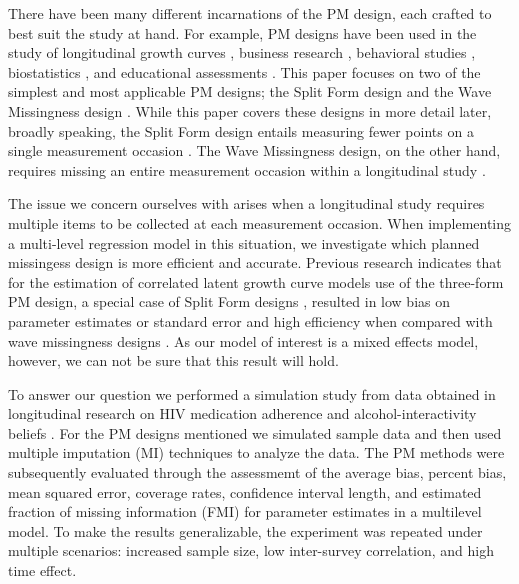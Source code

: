 \documentclass{svjour3}\usepackage[]{graphicx}\usepackage[]{color}
\begin{document}
There have been many different incarnations of the PM design, each crafted to best suit the study at hand. For example, PM designs have been used in the study of longitudinal growth curves \citep{graham2001planned, mcardle1997expanding}, business research \citep{shoemaker1973principles}, behavioral studies \citep{harel2015designed}, biostatistics \citep{andres2006partial, wacholder1994partial}, and educational assessments \citep{zeger1997efficient, sirotnik1977incidence}. This paper focuses on two of the simplest and most applicable PM designs; the Split Form design \citep{raghunathan1995split} and the Wave Missingness design \citep{little2013planned}. While this paper covers these designs in more detail later, broadly speaking, the Split Form design entails measuring fewer points on a single measurement occasion \citep{raghunathan1995split}. The Wave Missingness design, on the other hand, requires missing an entire measurement occasion within a longitudinal study \citep{graham2001planned}. 

The issue we concern ourselves with arises when a longitudinal study requires multiple items to be collected at each measurement occasion. When implementing a multi-level regression model in this situation, we investigate which planned missingess design is more efficient and accurate. Previous research indicates that for the estimation of correlated latent growth curve models use of the three-form PM design, a special case of Split Form designs \citep{raghunathan1995split}, resulted in low bias on parameter estimates or standard error and high efficiency when compared with wave missingness designs \citep{rhemtulla2014planned}. As our model of interest is a mixed effects model, however, we can not be sure that this result will hold. \par 

To answer our question we performed a simulation study from data obtained in longitudinal research on HIV medication adherence and alcohol-interactivity beliefs \citep{pellowski2016alcohol}. For the PM designs mentioned we simulated sample data and then used multiple imputation (MI) \citep{little2014statistical}  techniques to analyze the data. The PM methods were subsequently evaluated through the assessmemt of the average bias, percent bias, mean squared error, coverage rates, confidence interval length, and estimated fraction of missing information (FMI) \citep{little2014statistical} for parameter estimates in a multilevel model. To make the results generalizable, the experiment was repeated under multiple scenarios: increased sample size, low inter-survey correlation, and high time effect. \par
\end{document}
